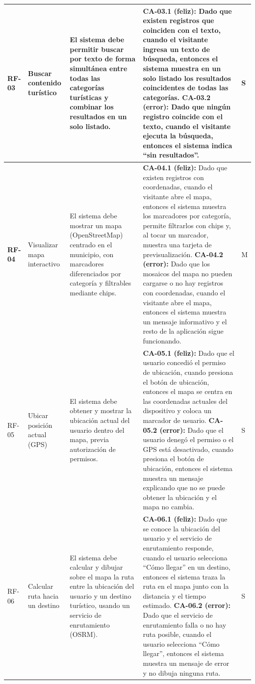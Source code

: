 \begin{longtable}{|>{\bfseries}p{1.2cm}|p{2.3cm}|p{3.4cm}|p{5.9cm}|>{\centering\arraybackslash}p{1.1cm}|}
RF-03 & Buscar contenido turístico & El sistema debe permitir buscar por texto de forma simultánea entre todas las categorías turísticas y combinar los resultados en un solo listado. &
\textbf{CA-03.1 (feliz):} Dado que existen registros que coinciden con el texto, cuando el visitante ingresa un texto de búsqueda, entonces el sistema muestra en un solo listado los resultados coincidentes de todas las categorías.
\newline
\textbf{CA-03.2 (error):} Dado que ningún registro coincide con el texto, cuando el visitante ejecuta la búsqueda, entonces el sistema indica ``sin resultados''. & S \\ \hline

RF-04 & Visualizar mapa interactivo & El sistema debe mostrar un mapa (OpenStreetMap) centrado en el municipio, con marcadores diferenciados por categoría y filtrables mediante chips. &
\textbf{CA-04.1 (feliz):} Dado que existen registros con coordenadas, cuando el visitante abre el mapa, entonces el sistema muestra los marcadores por categoría, permite filtrarlos con chips y, al tocar un marcador, muestra una tarjeta de previsualización.
\newline
\textbf{CA-04.2 (error):} Dado que los mosaicos del mapa no pueden cargarse o no hay registros con coordenadas, cuando el visitante abre el mapa, entonces el sistema muestra un mensaje informativo y el resto de la aplicación sigue funcionando. & M \\ \hline

RF-05 & Ubicar posición actual (GPS) & El sistema debe obtener y mostrar la ubicación actual del usuario dentro del mapa, previa autorización de permisos. &
\textbf{CA-05.1 (feliz):} Dado que el usuario concedió el permiso de ubicación, cuando presiona el botón de ubicación, entonces el mapa se centra en las coordenadas actuales del dispositivo y coloca un marcador de usuario.
\newline
\textbf{CA-05.2 (error):} Dado que el usuario denegó el permiso o el GPS está desactivado, cuando presiona el botón de ubicación, entonces el sistema muestra un mensaje explicando que no se puede obtener la ubicación y el mapa no cambia. & S \\ \hline

RF-06 & Calcular ruta hacia un destino & El sistema debe calcular y dibujar sobre el mapa la ruta entre la ubicación del usuario y un destino turístico, usando un servicio de enrutamiento (OSRM). &
\textbf{CA-06.1 (feliz):} Dado que se conoce la ubicación del usuario y el servicio de enrutamiento responde, cuando el usuario selecciona ``Cómo llegar'' en un destino, entonces el sistema traza la ruta en el mapa junto con la distancia y el tiempo estimado.
\newline
\textbf{CA-06.2 (error):} Dado que el servicio de enrutamiento falla o no hay ruta posible, cuando el usuario selecciona ``Cómo llegar'', entonces el sistema muestra un mensaje de error y no dibuja ninguna ruta. & S \\ \hline


\end{longtable}

